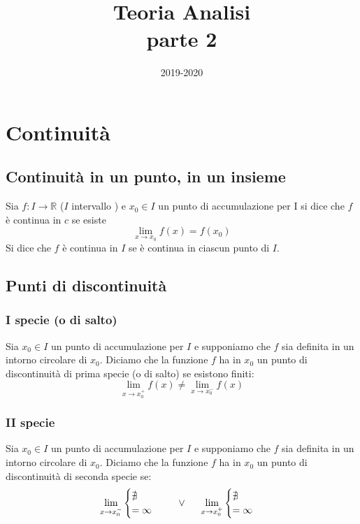 \documentclass[12pt]{article}
\title{
Teoria Analisi\\
parte 2\\}
\author{}
\date{2019-2020}
\begin{document}
\maketitle

\section{Continuità}

\subsection{Continuità in un punto, in un insieme}

Sia $f: I \rightarrow \mathbb{R}$ ($I$ intervallo ) e
$x_0 \in I$ un punto di accumulazione per I
si dice che $f$ è continua in $c$ se esiste
\[  \lim_{x \to x_0} f(x) = f(x_0)\]
Si dice che $f$ è continua in $I$ se è continua in ciascun punto di $I$.

\subsection{Punti di discontinuità}

\subsubsection{I specie (o di salto)}
Sia $x_0 \in I$ un punto di accumulazione per $I$
e supponiamo che $f$ sia definita in un intorno
circolare di $x_0$. Diciamo che la funzione $f$ ha
in $x_0$ un punto di discontinuità di prima specie
(o di salto) se esistono finiti:
\[ \lim_{x \to x_{0}^{+}} f(x) \neq \displaystyle \lim_{x \to x_{0}^{-}} f(x) \]

\subsubsection{II specie}
Sia $x_0 \in I$ un punto di accumulazione per $I$
e supponiamo che $f$ sia definita in un intorno
circolare di $x_0$. Diciamo che la funzione $f$ ha
in $x_0$ un punto di discontinuità di seconda specie se:
\[ \lim_{x \to x_{0}^-} \begin{cases} \nexists \\
= \infty \end{cases} \hspace{0.5cm} \vee \hspace{0.5cm} \lim_{x \to x_{0}^+} \begin{cases} \nexists \\
= \infty \end{cases} \]
\end{document}
